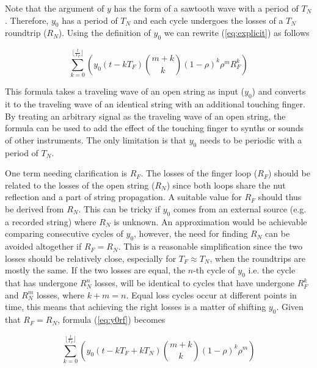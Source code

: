 \documentclass{sigchi}
\begin{document}

Note that the argument of $y$ has the form of a sawtooth wave with a period of $T_N$. Therefore, $y_0$ has a period of $T_N$ and each cycle undergoes the losses of a $T_N$ roundtrip ($R_N$).
Using the definition of $y_0$ we can rewrite (\ref{eq:explicit}) as follows

\begin{equation} \label{eq:y0rf}
	\sum_{k=0}^{\lfloor \frac{t}{T_F} \rfloor}\left(y_0(t - kT_F)\binom{m+k}{k} (1 - \rho)^{k} \rho^mR_F^k\right)
\end{equation}


This formula takes a traveling wave of an open string as input ($y_0$) and converts it to the traveling wave of an identical string with an additional touching finger. By treating an arbitrary signal as the traveling wave of an open string, the formula can be used to add the effect of the touching finger to synths or sounds of other instruments. The only limitation is that $y_0$ needs to be periodic with a period of $T_N$.

One term needing clarification is $R_F$. The losses of the finger loop ($R_F$) should be related to the losses of the open string ($R_N$) since both loops share the nut reflection and a part of string propagation. A suitable value for $R_F$ should thus be derived from $R_N$. This can be tricky if $y_0$ comes from an external source (e.g. a recorded string) where $R_N$ is unknown. An approximation would be achievable comparing consecutive cycles of $y_0$, however, the need for finding $R_N$ can be avoided altogether if $R_F = R_N$. This is a reasonable simplification since the two losses should be relatively close, especially for $T_F \approx T_N$, when the roundtrips are mostly the same. If the two losses are equal, the $n$-th cycle of $y_0$ i.e. the cycle that has undergone $R_N^n$ losses, will be identical to cycles that have undergone $R_F^k$ and $R_N^m$ losses, where $k+m=n$. Equal loss cycles occur at different points in time, this means that achieving the right losses is a matter of shifting $y_0$. Given that $R_F = R_N$, formula (\ref{eq:y0rf}) becomes

\begin{equation} \label{eq:y0}
	\sum_{k=0}^{\lfloor \frac{t}{T_F} \rfloor}\left(y_0(t - kT_F + kT_N)\binom{m+k}{k} (1 - \rho)^{k} \rho^m\right)
\end{equation}

\end{document}
